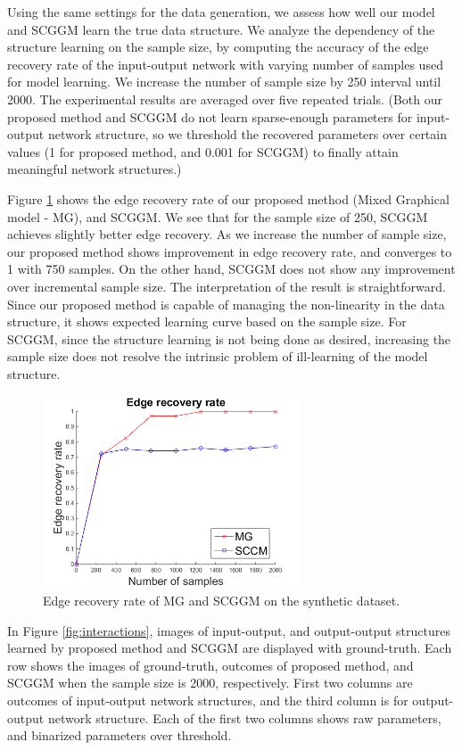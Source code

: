 \documentclass{article}
\begin{document}
Using the same settings for the data generation, we assess how well our model and SCGGM learn the true data structure.
We analyze the dependency of the structure learning on the sample size, by computing the accuracy of the edge recovery rate of the input-output network with varying number of samples used for model learning.
We increase the number of sample size by 250 interval until 2000.
The experimental results are averaged over five repeated trials.
(Both our proposed method and SCGGM do not learn sparse-enough parameters for input-output network structure, so we threshold the recovered parameters over certain values (1 for proposed method, and 0.001 for SCGGM) to finally attain meaningful network structures.)

Figure \ref{fig:syn_edge_rec} shows the edge recovery rate of our proposed method (Mixed Graphical model - MG), and SCGGM.
We see that for the sample size of 250, SCGGM achieves slightly better edge recovery. 
As we increase the number of sample size, our proposed method shows improvement in edge recovery rate, and converges to 1 with 750 samples. 
On the other hand, SCGGM does not show any improvement over incremental sample size.
The interpretation of the result is straightforward.
Since our proposed method is capable of managing the non-linearity in the data structure, it shows expected learning curve based on the sample size.
For SCGGM, since the structure learning is not being done as desired, increasing the sample size does not resolve the intrinsic problem of ill-learning of the model structure.

\begin{figure}[h]
  \centering
  \includegraphics[width=3in]{figure/EdgeRecRate2.png}
  \caption[] {Edge recovery rate of MG and SCGGM on the synthetic dataset.\label{fig:syn_edge_rec}}
\end{figure}


In Figure \ref{fig:interactions}, images of input-output, and output-output structures learned by proposed method and SCGGM are displayed with ground-truth.
Each row shows the images of ground-truth, outcomes of proposed method, and SCGGM when the sample size is 2000, respectively.
First two columns are outcomes of input-output network structures, and the third column is for output-output network structure. 
Each of the first two columns shows raw parameters, and binarized parameters over threshold.
\end{document}
